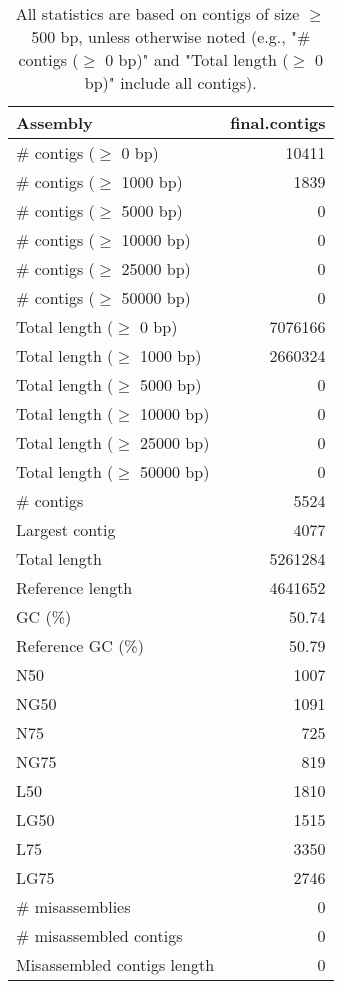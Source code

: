 \documentclass[12pt,a4paper]{article}
\begin{document}
\begin{table}[ht]
\begin{center}
\caption{All statistics are based on contigs of size $\geq$ 500 bp, unless otherwise noted (e.g., "\# contigs ($\geq$ 0 bp)" and "Total length ($\geq$ 0 bp)" include all contigs).}
\begin{tabular}{|l*{1}{|r}|}
\hline
Assembly & final.contigs \\ \hline
\# contigs ($\geq$ 0 bp) & 10411 \\ \hline
\# contigs ($\geq$ 1000 bp) & 1839 \\ \hline
\# contigs ($\geq$ 5000 bp) & 0 \\ \hline
\# contigs ($\geq$ 10000 bp) & 0 \\ \hline
\# contigs ($\geq$ 25000 bp) & 0 \\ \hline
\# contigs ($\geq$ 50000 bp) & 0 \\ \hline
Total length ($\geq$ 0 bp) & 7076166 \\ \hline
Total length ($\geq$ 1000 bp) & 2660324 \\ \hline
Total length ($\geq$ 5000 bp) & 0 \\ \hline
Total length ($\geq$ 10000 bp) & 0 \\ \hline
Total length ($\geq$ 25000 bp) & 0 \\ \hline
Total length ($\geq$ 50000 bp) & 0 \\ \hline
\# contigs & 5524 \\ \hline
Largest contig & 4077 \\ \hline
Total length & 5261284 \\ \hline
Reference length & 4641652 \\ \hline
GC (\%) & 50.74 \\ \hline
Reference GC (\%) & 50.79 \\ \hline
N50 & 1007 \\ \hline
NG50 & 1091 \\ \hline
N75 & 725 \\ \hline
NG75 & 819 \\ \hline
L50 & 1810 \\ \hline
LG50 & 1515 \\ \hline
L75 & 3350 \\ \hline
LG75 & 2746 \\ \hline
\# misassemblies & 0 \\ \hline
\# misassembled contigs & 0 \\ \hline
Misassembled contigs length & 0 \\ \hline

\end{tabular}
\end{center}
\end{table}
\end{document}
